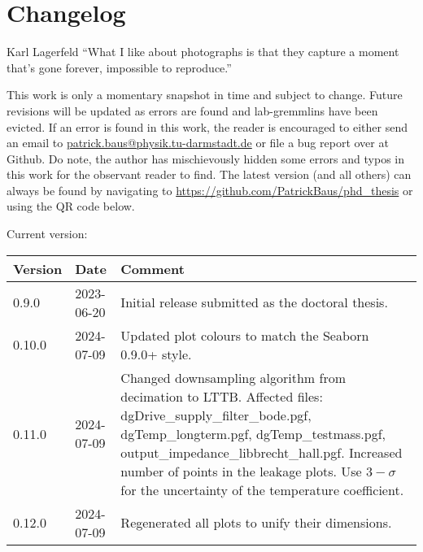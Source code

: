\chapter{Changelog}
\begin{chapquote}{Karl Lagerfeld}
``What I like about photographs is that they capture a moment that’s gone forever, impossible to reproduce.''
\end{chapquote}

This work is only a momentary snapshot in time and subject to change. Future revisions will be updated as errors are found and lab-gremmlins have been evicted. If an error is found in this work, the reader is encouraged to either send an email to \url{patrick.baus@physik.tu-darmstadt.de} or file a bug report over at Github. Do note, the author has mischievously hidden some errors and typos in this work for the observant reader to find. The latest version (and all others) can always be found by navigating to \url{https://github.com/PatrickBaus/phd_thesis} or using the QR code below.
\begin{center}
\end{center}

\begin{center}
    \begin{minipage}{0.8\linewidth}
        \centering
        Current version: \versionNumber
    \end{minipage}%
\end{center}

\begin{table}[h]
    \centering
    \begin{tabularx}{0.95\textwidth}{ll>{\raggedright\arraybackslash}X}
        Version& Date& Comment\\
        \hline
        0.9.0 &2023-06-20 & Initial release submitted as the doctoral thesis.\\
        0.10.0 &2024-07-09 & Updated plot colours to match the Seaborn 0.9.0+ style.\\
        0.11.0 &2024-07-09 & Changed downsampling algorithm from decimation to LTTB. Affected files: dgDrive\_supply\_filter\_bode.pgf, dgTemp\_longterm.pgf, dgTemp\_testmass.pgf, output\_impedance\_libbrecht\_hall.pgf. Increased number of points in the leakage plots. Use $3-\sigma$ for the uncertainty of the temperature coefficient.\\
        0.12.0 &2024-07-09 & Regenerated all plots to unify their dimensions.
    \end{tabularx}
\end{table}
